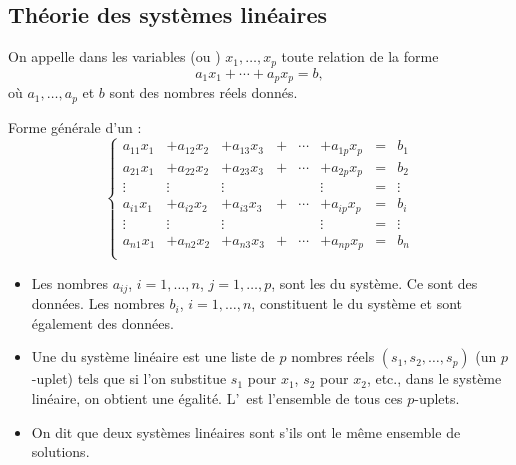 \documentclass[10pt,class=article,crop=false]{standalone}
\begin{document}
\begin{multicols}{2}
\subsection{Théorie des systèmes linéaires}



	On appelle  dans les variables (ou )
	$x_1,\ldots,x_p$ toute relation de la forme
	\begin{equation}
		a_1 x_1 + \cdots + a_p x_p = b,
	\end{equation}
	où $a_1, \ldots, a_p $ et $b$ sont des nombres réels donnés.



Forme générale d'un  :
$$\left\{
\begin{array}{cccccccc}
	a_{11}x_1 & +a_{12}x_2  &+a_{13}x_3&+&\cdots&+a_{1p}x_p&=&b_1   \\
	a_{21}x_1 & +a_{22}x_2  &+a_{23}x_3&+&\cdots&+a_{2p}x_p&=&b_2   \\
	\vdots &  \vdots  & \vdots&&& \vdots&=& \vdots   \\
	a_{i1}x_1 & +a_{i2}x_2  &+a_{i3}x_3&+&\cdots&+a_{ip}x_p&=&b_i  \\
	\vdots &  \vdots  & \vdots&&& \vdots&=& \vdots   \\
	a_{n1}x_1 & +a_{n2}x_2  &+a_{n3}x_3&+&\cdots&+a_{np}x_p&=&b_n   \\
\end{array}
\right.
$$

\begin{itemize}
	\item Les nombres $a_{ij}$, $i=1,\ldots, n$, $j=1,\ldots, p$, sont les  du système.
Ce sont des données. Les nombres $b_{i}$, $i=1,\ldots, n$, constituent le
 du système et sont également des données.


	\item 	Une  du système linéaire est une liste de
	$p$ nombres réels $(s_1,s_2,\ldots,s_p)$ (un $p$-uplet) tels que si
	l'on substitue $s_1$ pour $x_1$, $s_2$ pour $x_2$, etc., dans le système
	linéaire, on obtient une égalité. L'\,
	est l'ensemble de tous ces $p$-uplets.


	\item 	\label{systemes equivalents}
	On dit que deux systèmes linéaires sont 
	s'ils ont le même ensemble de solutions.
\end{itemize}




\end{multicols}
\end{document}
